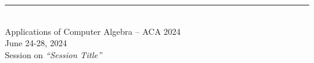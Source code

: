 \documentclass{article}
\newcommand{\HEADING}{
{\noindent \small Applications of Computer Algebra -- ACA 2024 \\
\small June 24-28, 2024\\
Session on \textit{``Session Title''}}
\vspace{10pt}}
\begin{document}
	
\rule{\textwidth}{0.01 in}\\[-2em]
	
\HEADING	

\vspace{1cm}




\end{document}
